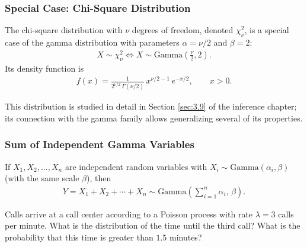 \subsubsection{Special Case: Chi-Square Distribution}

The chi-square distribution with $\nu$ degrees of freedom, denoted $\chi^2_\nu$, is a special case of the gamma distribution with parameters $\alpha = \nu/2$ and $\beta = 2$:
\begin{align}
 \label{eq:2.8.9}
 X \sim \chi^2_\nu \iff X \sim \text{Gamma}\!\left(\frac{\nu}{2}, 2\right).
\end{align}
Its density function is
\begin{align}
 f(x) = \frac{1}{2^{\nu/2}\,\Gamma(\nu/2)}\,x^{\nu/2-1}\,e^{-x/2}, \qquad x > 0.
\end{align}

This distribution is studied in detail in Section \ref{sec:3.9} of the inference chapter; its connection with the gamma family allows generalizing several of its properties.

\subsubsection{Sum of Independent Gamma Variables}

\begin{teorema}
If $X_1, X_2, \dots, X_n$ are independent random variables with $X_i \sim \text{Gamma}(\alpha_i, \beta)$ (with the same scale $\beta$), then
\begin{align}
 \label{eq:2.8.10}
 Y = X_1 + X_2 + \cdots + X_n \sim \text{Gamma}\!\left(\sum_{i=1}^n \alpha_i,\, \beta\right).
\end{align}
\end{teorema}

\begin{ejemplo}
 \label{exmp:2.8.3}
Calls arrive at a call center according to a Poisson process with rate $\lambda = 3$ calls per minute. What is the distribution of the time until the third call? What is the probability that this time is greater than $1.5$ minutes?
\end{ejemplo}


